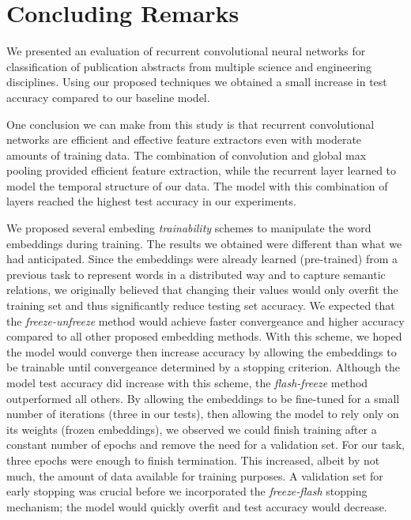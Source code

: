 
\chapter{Concluding Remarks}
We presented an evaluation of recurrent convolutional neural networks for classification of publication abstracts from multiple science and
engineering disciplines. Using our proposed techniques we obtained a small increase in test accuracy compared to our baseline model.

One conclusion we can make from this study is that recurrent convolutional networks are efficient and effective feature extractors even with
moderate amounts of training data. The combination of convolution and global max pooling provided efficient feature extraction, while the recurrent layer
learned to model the temporal structure of our data. The model with this combination of layers reached the highest test accuracy in our experiments.

We proposed several embeding \textit{trainability} schemes to manipulate the word embeddings during training.
The results we obtained were different than what we had anticipated. Since the embeddings were already learned (pre-trained) from a previous task to represent words in a distributed way and to capture semantic relations,
we originally believed that changing their values would only overfit the training set and thus significantly reduce testing set accuracy.
We expected that the \textit{freeze-unfreeze} method would achieve faster convergeance and higher accuracy compared to all other proposed embedding methods.
With this scheme, we hoped the model would converge then increase accuracy by allowing the embeddings to be trainable until convergeance determined by
a stopping criterion. Although the model test accuracy did increase with this scheme, the \textit{flash-freeze} method outperformed all others.
By allowing the embeddings to be fine-tuned for a small number of iterations (three in our tests), then allowing the model to rely
only on its weights (frozen embeddings), we observed we could finish training after a constant number of epochs and remove the need for a validation set.
For our task, three epochs were enough to finish termination. This increased, albeit by not much, the amount of data available for training purposes.
A validation set for early stopping was crucial before we incorporated the \textit{freeze-flash} stopping mechanism; the model would quickly overfit and test accuracy
would decrease.

